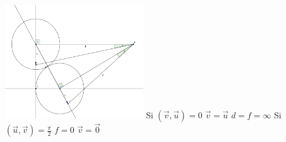 \documentclass{beamer}
\begin{document}
\begin{frame}
  \begin{multicols}{2}
    \includegraphics[width=6cm]{Images/geogebra_2.png}
    \vfill
    \columnbreak
    Si $(\overrightarrow{v}, \overrightarrow{u}) = 0$ \smallbreak
    $\overrightarrow{v} = \overrightarrow{u}$ \smallbreak
    $d = f = \infty$ \smallbreak
    Si $(\overrightarrow{u}, \overrightarrow{v}) = \frac{\pi}{2}$ \smallbreak
    $f = 0$ \smallbreak
    $\overrightarrow{v} = \overrightarrow{0}$
  \end{multicols}
\end{frame}
\end{document}
